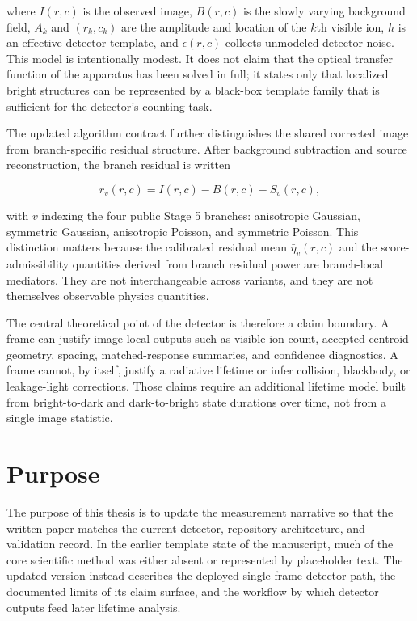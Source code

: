 \documentclass[12pt]{report}
\begin{document}
where $I(r,c)$ is the observed image, $B(r,c)$ is the slowly varying background field, $A_k$ and $(r_k,c_k)$ are the amplitude and location of the $k$th visible ion, $h$ is an effective detector template, and $\epsilon(r,c)$ collects unmodeled detector noise. This model is intentionally modest. It does not claim that the optical transfer function of the apparatus has been solved in full; it states only that localized bright structures can be represented by a black-box template family that is sufficient for the detector's counting task.

The updated algorithm contract further distinguishes the shared corrected image from branch-specific residual structure. After background subtraction and source reconstruction, the branch residual is written

$$
r_v(r,c) = I(r,c) - B(r,c) - S_v(r,c),
$$

with $v$ indexing the four public Stage 5 branches: anisotropic Gaussian, symmetric Gaussian, anisotropic Poisson, and symmetric Poisson. This distinction matters because the calibrated residual mean $\bar{\eta}_v(r,c)$ and the score-admissibility quantities derived from branch residual power are branch-local mediators. They are not interchangeable across variants, and they are not themselves observable physics quantities.

The central theoretical point of the detector is therefore a claim boundary. A frame can justify image-local outputs such as visible-ion count, accepted-centroid geometry, spacing, matched-response summaries, and confidence diagnostics. A frame cannot, by itself, justify a radiative lifetime or infer collision, blackbody, or leakage-light corrections. Those claims require an additional lifetime model built from bright-to-dark and dark-to-bright state durations over time, not from a single image statistic.

\section{Purpose}

The purpose of this thesis is to update the measurement narrative so that the written paper matches the current detector, repository architecture, and validation record. In the earlier template state of the manuscript, much of the core scientific method was either absent or represented by placeholder text. The updated version instead describes the deployed single-frame detector path, the documented limits of its claim surface, and the workflow by which detector outputs feed later lifetime analysis.
\end{document}
